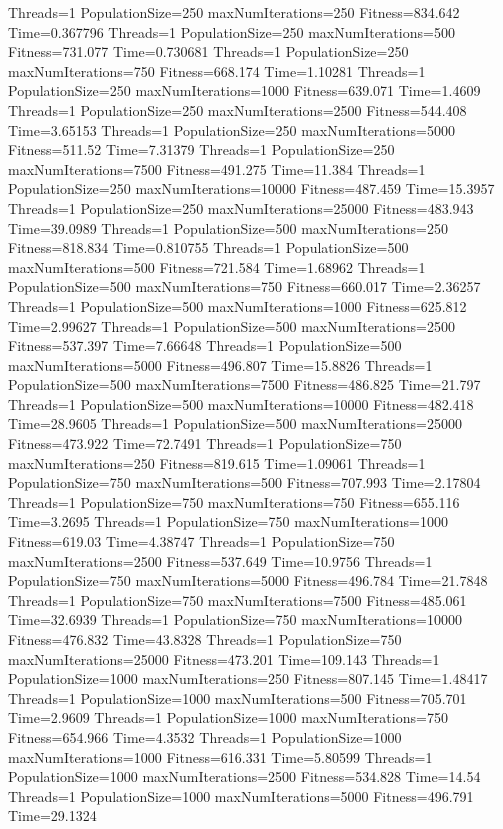 \documentclass[10pt,letterpaper]{article}
\begin{document}
Threads=1 PopulationSize=250 maxNumIterations=250 Fitness=834.642 Time=0.367796
Threads=1 PopulationSize=250 maxNumIterations=500 Fitness=731.077 Time=0.730681
Threads=1 PopulationSize=250 maxNumIterations=750 Fitness=668.174 Time=1.10281
Threads=1 PopulationSize=250 maxNumIterations=1000 Fitness=639.071 Time=1.4609
Threads=1 PopulationSize=250 maxNumIterations=2500 Fitness=544.408 Time=3.65153
Threads=1 PopulationSize=250 maxNumIterations=5000 Fitness=511.52 Time=7.31379
Threads=1 PopulationSize=250 maxNumIterations=7500 Fitness=491.275 Time=11.384
Threads=1 PopulationSize=250 maxNumIterations=10000 Fitness=487.459 Time=15.3957
Threads=1 PopulationSize=250 maxNumIterations=25000 Fitness=483.943 Time=39.0989
Threads=1 PopulationSize=500 maxNumIterations=250 Fitness=818.834 Time=0.810755
Threads=1 PopulationSize=500 maxNumIterations=500 Fitness=721.584 Time=1.68962
Threads=1 PopulationSize=500 maxNumIterations=750 Fitness=660.017 Time=2.36257
Threads=1 PopulationSize=500 maxNumIterations=1000 Fitness=625.812 Time=2.99627
Threads=1 PopulationSize=500 maxNumIterations=2500 Fitness=537.397 Time=7.66648
Threads=1 PopulationSize=500 maxNumIterations=5000 Fitness=496.807 Time=15.8826
Threads=1 PopulationSize=500 maxNumIterations=7500 Fitness=486.825 Time=21.797
Threads=1 PopulationSize=500 maxNumIterations=10000 Fitness=482.418 Time=28.9605
Threads=1 PopulationSize=500 maxNumIterations=25000 Fitness=473.922 Time=72.7491
Threads=1 PopulationSize=750 maxNumIterations=250 Fitness=819.615 Time=1.09061
Threads=1 PopulationSize=750 maxNumIterations=500 Fitness=707.993 Time=2.17804
Threads=1 PopulationSize=750 maxNumIterations=750 Fitness=655.116 Time=3.2695
Threads=1 PopulationSize=750 maxNumIterations=1000 Fitness=619.03 Time=4.38747
Threads=1 PopulationSize=750 maxNumIterations=2500 Fitness=537.649 Time=10.9756
Threads=1 PopulationSize=750 maxNumIterations=5000 Fitness=496.784 Time=21.7848
Threads=1 PopulationSize=750 maxNumIterations=7500 Fitness=485.061 Time=32.6939
Threads=1 PopulationSize=750 maxNumIterations=10000 Fitness=476.832 Time=43.8328
Threads=1 PopulationSize=750 maxNumIterations=25000 Fitness=473.201 Time=109.143
Threads=1 PopulationSize=1000 maxNumIterations=250 Fitness=807.145 Time=1.48417
Threads=1 PopulationSize=1000 maxNumIterations=500 Fitness=705.701 Time=2.9609
Threads=1 PopulationSize=1000 maxNumIterations=750 Fitness=654.966 Time=4.3532
Threads=1 PopulationSize=1000 maxNumIterations=1000 Fitness=616.331 Time=5.80599
Threads=1 PopulationSize=1000 maxNumIterations=2500 Fitness=534.828 Time=14.54
Threads=1 PopulationSize=1000 maxNumIterations=5000 Fitness=496.791 Time=29.1324
\end{document}
